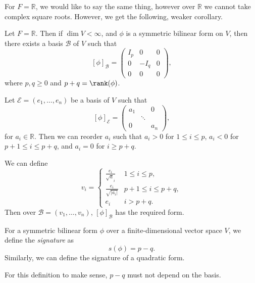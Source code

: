 \documentclass[12pt]{article}
\begin{document}
For $F = \mathbb{R}$, we would like to say the same thing, however over $\mathbb{R}$ we cannot take complex square roots. However, we get the following, weaker corollary.

\begin{corollary}
	Let $F = \mathbb{R}$. Then if $\dim V < \infty$, and $\phi$ is a symmetric bilinear form on $V$, then there exists a basis $\mathcal{B}$ of $V$ such that
	\[
		[\phi]_{\mathcal{B}} =
		\begin{pmatrix}
			I_p & 0 & 0 \\
			   0 & -I_q & 0 \\
			0 & 0 & 0
		\end{pmatrix}
	,\]
	where $p, q \geq 0$ and $p + q = \rank(\phi)$.
\end{corollary}

\begin{proofbox}
	Let $\mathcal{E} = (e_1, \ldots, e_n)$ be a basis of $V$ such that
	\[
		[\phi]_{\mathcal{E}} =
		\begin{pmatrix}
			a_1 & & 0 \\
			    & \ddots & \\
			0 & & a_n
		\end{pmatrix}
	,\]
	for $a_i \in \mathbb{R}$. Then we can reorder $a_i$ such that $a_i > 0$ for $1 \leq i \leq p$, $a_i < 0$ for $p+1 \leq i \leq p+q$, and $a_i = 0$ for $i \geq p+q$.

	We can define
	\[
	v_i =
	\begin{cases}
		\frac{e_i}{\sqrt a_i} & 1 \leq i \leq p, \\
		\frac{e_i}{\sqrt{|a_i|}} & p+1 \leq i \leq p+q, \\
		e_i & i > p+q.
	\end{cases}
	\]
	Then over $\mathcal{B} = (v_1, \ldots, v_n)$, $[\phi]_{\mathcal{B}}$ has the required form.
\end{proofbox}

\begin{definition}[Signature]
	For a symmetric bilinear form $\phi$ over a finite-dimensional vector space $V$, we define the \textit{signature} as
	\[
	s(\phi) = p - q
	.\]
	Similarly, we can define the signature of a quadratic form.
\end{definition}

For this definition to make sense, $p - q$ must not depend on the basis.
\end{document}
